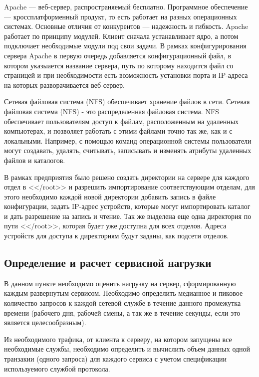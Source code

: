 Apache — веб-сервер, распространяемый бесплатно. Программное обеспечение — кроссплатформенный продукт, то есть работает на разных операционных системах. Основные отличия от конкурентов — надежность и гибкость. Apache\cite{apache-vs-nginx} работает по принципу модулей. Клиент сначала устанавливает ядро, а потом подключает необходимые модули под свои задачи. В рамках конфигурирования сервера Apache в первую очередь добавляется конфигурационный файл, в котором указыается название сервера, путь по которому находится файл со страницей и при необходимости есть возможность установки порта и IP-адреса на которых разворачивается веб-сервер.

Сетевая файловая система (NFS) обеспечивает хранение файлов в сети. Сетевая файловая система (NFS) - это распределенная файловая система. NFS обеспечивает пользователям доступ к файлам, расположенным на удаленных компьютерах, и позволяет работать с этими файлами точно так же, как и с локальными. Например, с помощью команд операционной системы пользователи могут создавать, удалять, считывать, записывать и изменять атрибуты удаленных файлов и каталогов.

В рамках предприятия было решено создать директории на сервере для каждого отдел в <</root>> и разрешить импортирование соответствующим отделам, для этого необходимо каждой новой директории добавить запись в файле конфигурации, задать IP-адрес устройств, которые могут импортировать каталог и дать разрешение на запись и чтение. Так же выделена еще одна директория по пути <</root>>, которая будет уже доступна для всех отделов. Адреса устройств для доступа к директориям будут заданы, как подсети отделов.


\subsection{Определение и расчет сервисной нагрузки}

В данном пункте необходимо оценить нагрузку на сервер, сформированную каждым развернутым сервисом. Необходимо определить медианное и пиковое количество запросов к каждой сетевой службе в течение данного промежутка времени (рабочего дня, рабочей смены, а так же в течение секунды, если это является целесообразным).

Из необходимого трафика, от клиента к серверу, на котором запущены все необходимые службы, необходимо определить и вычислить объем данных одной транзакии (одного запроса) для каждого сервиса с учетом спецификации используемого службой протокола.

